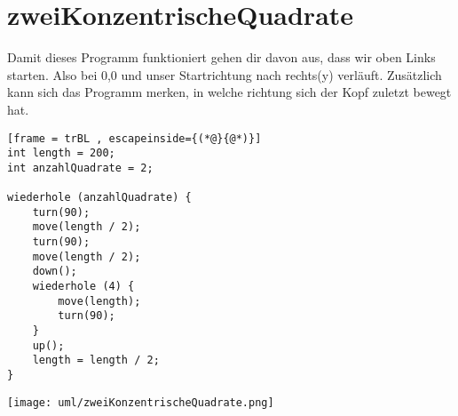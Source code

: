 \section{zweiKonzentrischeQuadrate}
Damit dieses Programm funktioniert gehen dir davon aus, dass wir oben Links starten. Also bei 0,0 und unser Startrichtung nach rechts(y) verläuft. Zusätzlich kann sich das Programm merken, in welche richtung sich der Kopf zuletzt bewegt hat.

\begin{lstlisting}[frame = trBL , escapeinside={(*@}{@*)}]
int length = 200;
int anzahlQuadrate = 2;

wiederhole (anzahlQuadrate) {
	turn(90);
	move(length / 2);
	turn(90);
	move(length / 2);
	down();
	wiederhole (4) {
		move(length);
		turn(90);
	}
	up();
	length = length / 2;
}
\end{lstlisting}

\texttt{[image: uml/zweiKonzentrischeQuadrate.png]}